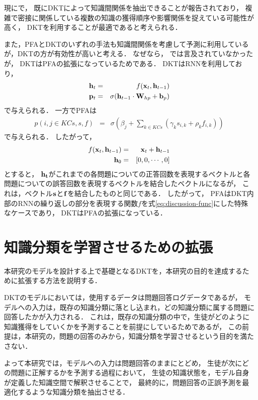 現に\cite{piech2015deep}で，
既にDKTによって知識間関係を抽出できることが報告されており，
複雑で密接に関係している複数の知識の獲得順序や影響関係を捉えている可能性が高く，
DKTを利用することが最適であると考えられる．


また，PFAとDKTのいずれの手法も知識間関係を考慮して予測に利用しているが，DKTの方が有効性が高いと考える．
なぜなら，
\cite{piech2015deep}では言及されていなかったが，
DKTはPFAの拡張になっているためである．
DKTはRNNを利用しており，
\begin{eqnarray}
{\bf h}_t & = & f({\bf x}_t, {\bf h}_{t-1})\\
{\bf p}_t & = & \sigma({\bf h}_{t-1} \cdot {\bf W}_{hp} + {\bf b}_p)
\end{eqnarray}
で与えられる．
一方でPFAは
\begin{eqnarray}
	p(i, j \in KCs, s, f) & = & \sigma( \beta _j + \sum_{k \in KCs}(\gamma_k s_{i, k} + \rho _k f_{i, k}) )
\end{eqnarray}
で与えられる．
したがって，
\begin{eqnarray}
\label{eq:discussion-func}
	f({\bf x}_t, {\bf h}_{t-1}) &=& {\bf x}_t + {\bf h}_{t-1}\\
	{\bf h}_{0} & = & [0, 0, \cdots , 0]
\end{eqnarray}
とすると，
${\bf h_t}$がこれまでの各問題についての正答回数を表現するベクトルと各問題についての誤答回数を表現するベクトルを結合したベクトルになるが， 
これは，ベクトル${\bf s}$と${\bf f}$を結合したものと同じである．
したがって，
PFAはDKT内部のRNNの繰り返しの部分を表現する関数$f$を式\ref{eq:discussion-func}にした特殊なケースであり，
DKTはPFAの拡張になっている．


\section{知識分類を学習させるための拡張}
本研究のモデルを設計する上で基礎となるDKTを，本研究の目的を達成するために拡張する方法を説明する．


DKTのモデルにおいては，使用するデータは問題回答ログデータであるが，
モデルへの入力は，既存の知識分類に落とし込まれ，どの知識分類に属する問題に回答したかが入力される．
これは，既存の知識分類の中で，生徒がどのように知識獲得をしていくかを予測することを前提にしているためであるが，
この前提は，本研究の，問題の回答のみから，知識分類を学習させるという目的を満たさない．

よって本研究では，モデルへの入力は問題回答のままにとどめ，
生徒が次にどの問題に正解するかを予測する過程において，
生徒の知識状態を，モデル自身が定義した知識空間で解釈させることで，
最終的に，問題回答の正誤予測を最適化するような知識分類を抽出させる．

